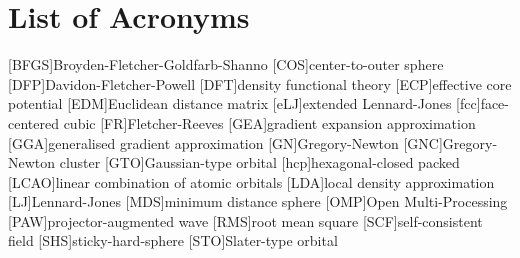 
\chapter*{List of Acronyms}

\begin{acronym}[ABCDEFGHIJK]
    [BFGS]{Broyden-Fletcher-Goldfarb-Shanno}
    [COS]{center-to-outer sphere}
    [DFP]{Davidon-Fletcher-Powell}
    [DFT]{density functional theory}
    [ECP]{effective core potential}
    [EDM]{Euclidean distance matrix}
    [eLJ]{extended Lennard-Jones}
    [fcc]{face-centered cubic}
    [FR]{Fletcher-Reeves}
	[GEA]{gradient expansion approximation}
	[GGA]{generalised gradient approximation}
    [GN]{Gregory-Newton}
    [GNC]{Gregory-Newton cluster}
    [GTO]{Gaussian-type orbital}
    [hcp]{hexagonal-closed packed}
    [LCAO]{linear combination of atomic orbitals}
    [LDA]{local density approximation}
    [LJ]{Lennard-Jones}
    [MDS]{minimum distance sphere}
    [OMP]{Open Multi-Processing}
    [PAW]{projector-augmented wave}
    [RMS]{root mean square}
    [SCF]{self-consistent field}
    [SHS]{sticky-hard-sphere}
    [STO]{Slater-type orbital}
\end{acronym}
